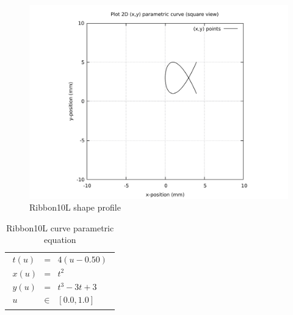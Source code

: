 \begin{figure}
	\caption{Ribbon10L shape profile}
	\label{Ribbon10L-curve-plot-BW.pdf}
	\centering
	\includegraphics[width=1.20\textwidth]{Chap3/curve-shape/curves/Ribbon10L-curve-plot-BW.pdf} 
\end{figure}

\begin{table}[ht]
\begin{center}
\begin{tabular}{ p{16.0cm} }
\caption{Ribbon10L curve parametric equation}
\begin{eqnarray}
	t(u) & = & 4(u - 0.50) \nonumber \\
	x(u) & = & t^2 \nonumber \\   
	y(u) & = & t^3 - 3t + 3 \nonumber \\
	u & \in & [0.0, 1.0] \nonumber
\end{eqnarray}
\end{tabular}
\end{center}
\end{table}

\clearpage
\pagebreak


